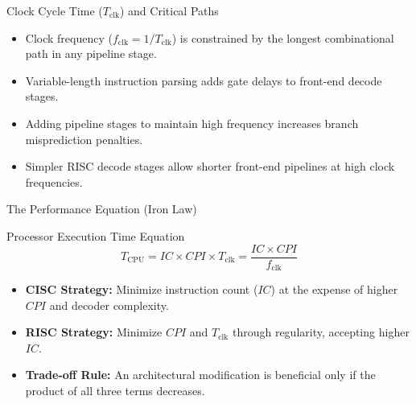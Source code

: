 \documentclass[aspectratio=169,11pt,t]{beamer}
\newcommand{\key}[1]{\textbf{#1}}
\begin{document}
\begin{frame}{Clock Cycle Time ($T_{\text{clk}}$) and Critical Paths}
\large
\begin{itemize}\setlength{\itemsep}{8pt}
  \item Clock frequency ($f_{\text{clk}} = 1/T_{\text{clk}}$) is constrained by the longest combinational path in any pipeline stage.
  \item Variable-length instruction parsing adds gate delays to front-end decode stages.
  \item Adding pipeline stages to maintain high frequency increases branch misprediction penalties.
  \item Simpler RISC decode stages allow shorter front-end pipelines at high clock frequencies.
\end{itemize}
\end{frame}


\begin{frame}{The Performance Equation (Iron Law)}
\begin{block}{Processor Execution Time Equation}
$$T_{\text{CPU}} = \mathit{IC} \times \mathit{CPI} \times T_{\text{clk}} = \frac{\mathit{IC} \times \mathit{CPI}}{f_{\text{clk}}}$$
\end{block}

\vspace{0.2cm}
\large
\begin{itemize}\setlength{\itemsep}{7pt}
  \item \key{CISC Strategy:} Minimize instruction count ($\mathit{IC}$) at the expense of higher $\mathit{CPI}$ and decoder complexity.
  \item \key{RISC Strategy:} Minimize $\mathit{CPI}$ and $T_{\text{clk}}$ through regularity, accepting higher $\mathit{IC}$.
  \item \key{Trade-off Rule:} An architectural modification is beneficial only if the product of all three terms decreases.
\end{itemize}
\end{frame}

\end{document}
